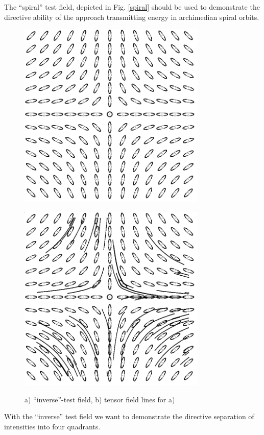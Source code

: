 \documentclass{scrartcl}
\begin{document}
The ``spiral'' test field, depicted in Fig. \ref{spiral} should be used to demonstrate the directive ability of the approach transmitting energy in archimedian spiral orbits.
\begin{figure}[!t]
\centering
  \begin{minipage}{0.4\textwidth}
    \includegraphics[width=0.8\textwidth]{img/inverse.png}
    \label{a)}
  \end{minipage}
  \begin{minipage}{0.4\textwidth}
    \includegraphics[width=0.8\textwidth]{img/inverse-TFL.png}
    \label{b)}
  \end{minipage}
\caption{a) ``inverse''-test field, b) tensor field lines for a)}
\label{inverse}
\end{figure}
With the \enquote{inverse} test field we want to demonstrate the directive separation of intensities into four quadrants.
\end{document}
